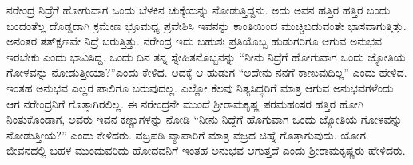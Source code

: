 ನರೇಂದ್ರ ನಿದ್ರೆಗೆ ಹೋಗುವಾಗ ಒಂದು ಬೆಳಕಿನ ಚುಕ್ಕೆಯನ್ನು ನೋಡುತ್ತಿದ್ದನು. ಅದು ಅವನ ಹತ್ತಿರ ಹತ್ತಿರ ಬಂದು ಬಂದಂತೆಲ್ಲ ದೊಡ್ಡದಾಗಿ ಕ್ರಮೇಣ ಭ್ರೂಮಧ್ಯ ಪ್ರವೇಶಿಸಿ ಇವನನ್ನು ಕಾಂತಿಯಿಂದ ಮುಚ್ಚಿಬಿಡುವಂತೇ ಭಾಸವಾಗುತ್ತಿತ್ತು. ಅನಂತರ ತತ್‍ಕ್ಷಣವೇ ನಿದ್ರೆ ಬರುತ್ತಿತ್ತು. ನರೇಂದ್ರ ಇದು ಬಹುಶಃ ಪ್ರತಿಯೊಬ್ಬ ಹುಡುಗರಿಗೂ ಆಗುವ ಅನುಭವ ಇರಬೇಕು ಎಂದು ಭಾವಿಸಿದ್ದ. ಒಂದು ದಿನ ತನ್ನ ಸ್ನೇಹಿತನೊಬ್ಬನನ್ನು “ನೀನು ನಿದ್ರೆಗೆ ಹೋಗುವಾಗ ಒಂದು ಜ್ಯೋತಿಯ ಗೋಳವನ್ನು ನೋಡುತ್ತೀಯಾ?”ಎಂದು ಕೇಳಿದ. ಅದಕ್ಕೆ ಆ ಹುಡುಗ “ಅದೇನು ನನಗೆ ಕಾಣುವುದಿಲ್ಲ” ಎಂದು ಹೇಳಿದ. ಇಂತಹ ಅನುಭವ ಎಲ್ಲರ ಪಾಲಿಗೂ ಬರುವುದಲ್ಲ. ಎಲ್ಲೋ ಕೆಲವು ನಿತ್ಯಸಿದ್ಧರಿಗೆ ಮಾತ್ರ ಆಗುವ ಅನುಭವಗಳೆಂದು ಆಗ ನರೇಂದ್ರನಿಗೆ ಗೊತ್ತಾಗಿರಲಿಲ್ಲ. ಈ ನರೇಂದ್ರನೇ ಮುಂದೆ ಶ‍್ರೀರಾಮಕೃಷ್ಣ ಪರಮಹಂಸರ ಹತ್ತಿರ ಹೋಗಿ ನಿಂತುಕೊಂಡಾಗ, ಅವರು ಇವನ ಕಣ್ಣುಗಳನ್ನು ನೋಡಿ “ನೀನು ನಿದ್ದೆಗೆ ಹೊಗುವಾಗ ಒಂದು ಜ್ಯೋತಿಯ ಗೋಳವನ್ನು ನೋಡುತ್ತೀಯ?” ಎಂದು ಕೇಳಿದರು. ವಜ್ರಪಡಿ ವ್ಯಾಪಾರಿಗೆ ಮಾತ್ರ ವಜ್ರದ ಚಿಹ್ನೆ ಗೊತ್ತಾಗುವುದು. ಯೋಗ ಜೀವನದಲ್ಲಿ ಬಹಳ ಮುಂದುವರಿದು ಹೋದವನಿಗೆ ಇಂತಹ ಅನುಭವ ಆಗುತ್ತದೆ ಎಂದು ಶ‍್ರೀರಾಮಕೃಷ್ಣರು ಹೇಳಿದರು.

